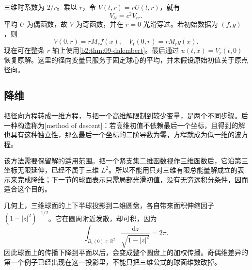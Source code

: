 三维时系数为 \(2/r\)。乘以 \(r\)，令 \(V(t,r)=rU(t,r)\)，就有
\[
 V_{tt}=c^2V_{rr}.
\]
平均 \(U\) 为偶函数，故 \(V\) 为奇函数，并在 \(r=0\) 光滑穿过。若初始数据为 \((f,g)\)，则
\[
 V(0,r)=rM_rf(x),\quad V_t(0,r)=rM_rg(x).
\]
现在可在整条 \(r\) 轴上使用\cref{b2:thm:09-dalembert}。最后通过 \(u(t,x)=V_r(t,0)\) 恢复原解。这里的径向变量只服务于固定球心的平均，并未假设原始初值关于原点径向。

\subsection{降维}
\label{b2:subsec:110103}

把径向方程转成一维方程，与把一个高维解限制到较少变量，是两个不同步骤。后一种构造称为[method of descent]：若高维初值不依赖最后一个坐标，且得到的解也具有这种独立性，那么最后一个坐标的二阶导数为零，方程就成为低一维的波方程。

\ProseParagraphBreak

该方法需要保留解的适用范围。把一个紧支集二维函数视作三维函数后，它沿第三坐标无限延伸，已经不属于三维 \(L^2\)。所以不能用只对三维有限总能量解成立的表示来完成降维；下一节的球面表示只需局部光滑初值，没有无穷远积分条件，因而适合这个目的。

\ProseParagraphBreak

几何上，三维球面的上下半球投影到二维圆盘，各自带来面积伸缩因子 \((1-|z|^2)^{-1/2}\)。它在圆周附近发散，却可积，因为
\[
 \int_{B_1(0)\subset\mathbb R^2}\dfrac{\mathrm{d}z}{\sqrt{1-|z|^2}}=2\pi.
\]
因此球面上的传播下降到平面以后，会变成整个圆盘上的加权传播。奇偶维差异的第一个例子已经出现在这一投影里，不能只把三维公式的球面维数改掉。


